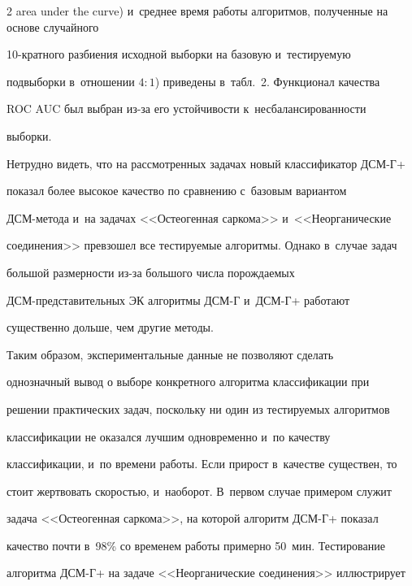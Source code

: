 \begin{multicols}{2}
  area under the curve) и~среднее время работы алгоритмов, полученные на основе случайного  


10-крат\-но\-го разбиения исходной выборки на базовую и~тестируемую 


подвыборки в~отношении $4:1$) приведены в~табл.~2. Функционал качества 


ROC AUC был выбран из-за его устойчивости к~несбалансированности 


выборки.


  


  Нетрудно видеть, что на рассмотренных задачах новый классификатор ДСМ-Г+ 


показал более высокое качество по сравнению с~базовым вариантом  


ДСМ-ме\-то\-да и~на задачах <<Остеогенная саркома>> и~<<Неорганические 


соединения>> превзошел все тестируемые алгоритмы. Однако в~случае задач 


большой размерности из-за большого числа по\-рож\-да\-емых  


ДСМ-пред\-ста\-ви\-тель\-ных ЭК алгоритмы ДСМ-Г и~ДСМ-Г+ работают 


существенно дольше, чем другие методы. 


  





  


  


  Таким образом, экспериментальные данные не позволяют сделать 


однозначный вывод о выборе конкретного алгоритма классификации при 


решении практических задач, поскольку ни один из тес\-ти\-ру\-емых алгоритмов 


классификации не оказался лучшим одновременно и~по качеству 


классификации, и~по времени работы. Если прирост в~качестве существен, то 


стоит жертвовать скоростью, и~наоборот. В~первом случае примером служит 


задача <<Остеогенная саркома>>, на которой алгоритм ДСМ-Г+ показал 


качество почти в~98\% со временем работы примерно 50~мин. Тестирование 


алгоритма ДСМ-Г+ на задаче <<Неорганические соединения>> иллюстрирует 



\end{multicols}
